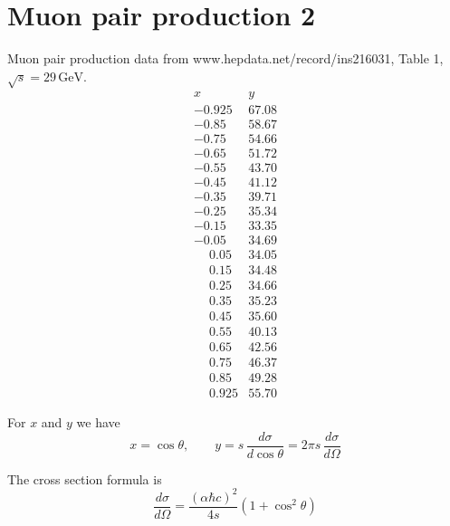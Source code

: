 

\section*{Muon pair production 2}

Muon pair production data from
www.hepdata.net/record/ins216031, Table 1, $\sqrt s=29\,\text{GeV}$.
\begin{equation*}
\begin{matrix}
x & y
\\[1ex]
-0.925 & 67.08\\
-0.85\phantom{0} & 58.67\\
-0.75\phantom{0} & 54.66\\
-0.65\phantom{0} & 51.72\\
-0.55\phantom{0} & 43.70\\
-0.45\phantom{0} & 41.12\\
-0.35\phantom{0} & 39.71\\
-0.25\phantom{0} & 35.34\\
-0.15\phantom{0} & 33.35\\
-0.05\phantom{0} & 34.69\\
\phantom{+}0.05\phantom{0} & 34.05\\
\phantom{+}0.15\phantom{0} & 34.48\\
\phantom{+}0.25\phantom{0} & 34.66\\
\phantom{+}0.35\phantom{0} & 35.23\\
\phantom{+}0.45\phantom{0} & 35.60\\
\phantom{+}0.55\phantom{0} & 40.13\\
\phantom{+}0.65\phantom{0} & 42.56\\
\phantom{+}0.75\phantom{0} & 46.37\\
\phantom{+}0.85\phantom{0} & 49.28\\
\phantom{+}0.925 & 55.70
\end{matrix}
\end{equation*}

For $x$ and $y$ we have
\begin{equation*}
x=\cos\theta,
\qquad
y=s\,\frac{d\sigma}{d\cos\theta}=2\pi s\,\frac{d\sigma}{d\Omega}
\end{equation*}

The cross section formula is
\begin{equation*}
\frac{d\sigma}{d\Omega}=\frac{(\alpha\hbar c)^2}{4s}\left(1+\cos^2\theta\right)
\end{equation*}

